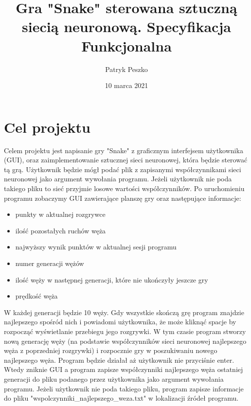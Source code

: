 \documentclass[12pt]{article}
\title{Gra "Snake" sterowana sztuczną siecią neuronową. Specyfikacja Funkcjonalna}
\author{Patryk Peszko}
\date{10 marca 2021}
\begin{document}
	\begin{titlepage}
		\clearpage\maketitle\thispagestyle{empty}
		\maketitle
	\end{titlepage}


\tableofcontents
\newpage
	\section {Cel projektu}

		Celem projektu jest napisanie gry "Snake" z graficznym interfejsem użytkownika (GUI), oraz zaimplementowanie sztucznej sieci neuronowej, która będzie sterować tą grą. Użytkownik będzie mógł podać plik z zapisanymi współczynnikami sieci neuronowej jako argument wywołania programu. Jeżeli użytkownik nie poda takiego pliku to sieć przyjmie losowe wartości współczynników. Po uruchomieniu programu zobaczymy GUI zawierające planszę gry oraz następujące informacje:
		\begin{itemize}
			\item punkty w aktualnej rozgrywce
			\item ilość pozostałych ruchów węża
			\item najwyższy wynik punktów w aktualnej sesji programu
			\item numer generacji wężów
			\item ilość węży w następnej generacji, które nie ukończyły jeszcze gry
			\item prędkość węża
		\end{itemize}
		W każdej generacji będzie 10 węży. Gdy wszystkie skończą grę program znajdzie najlepszego spośród nich i powiadomi użytkownika, że może kliknąć spacje by rozpocząć wyświetlanie przebiegu jego rozgrywki. W tym czasie program stworzy nową generację węży (na podstawie współczynników sieci neuronowej najlepszego węża z poprzedniej rozgrywki) i rozpocznie gry w poszukiwaniu nowego najlepszego węża. Program będzie działał aż użytkownik nie przyciśnie enter. Wtedy zniknie GUI a program zapisze współczynniki najlepszego węża ostatniej generacji do pliku podanego przez użytkownika jako argument wywołania programu. Jeżeli użytkownik nie poda takiego pliku, program zapisze informacje do pliku "wspolczynniki\_najlepszego\_weza.txt" w lokalizacji źródeł programu.
		
\end{document}
